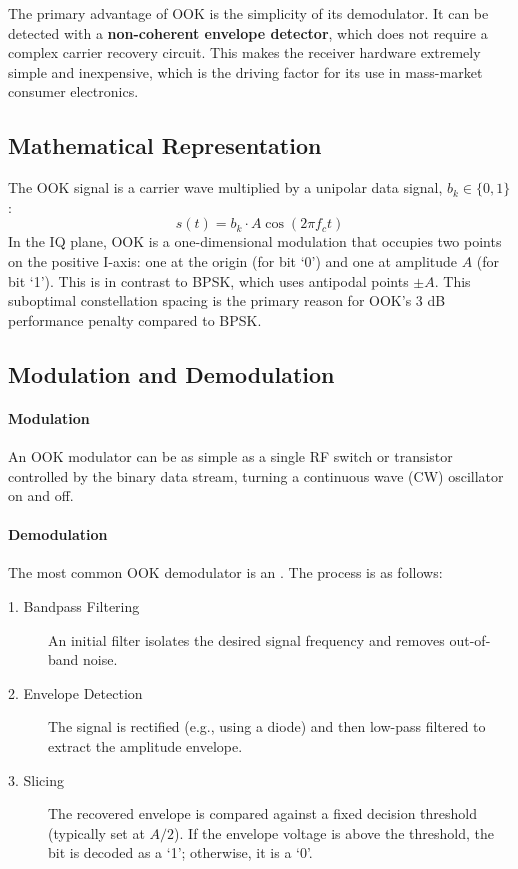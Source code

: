 \begin{keyconcept}
    The primary advantage of OOK is the simplicity of its demodulator. It can be detected with a \textbf{non-coherent envelope detector}, which does not require a complex carrier recovery circuit. This makes the receiver hardware extremely simple and inexpensive, which is the driving factor for its use in mass-market consumer electronics.
\end{keyconcept}


\subsection{Mathematical Representation}

The OOK signal is a carrier wave multiplied by a unipolar data signal, $b_k \in \{0, 1\}$:
\begin{equation}
    s(t) = b_k \cdot A \cos(2\pi f_c t)
\end{equation}
In the IQ plane, OOK is a one-dimensional modulation that occupies two points on the positive I-axis: one at the origin (for bit `0') and one at amplitude $A$ (for bit `1'). This is in contrast to BPSK, which uses antipodal points $\pm A$. This suboptimal constellation spacing is the primary reason for OOK's 3 dB performance penalty compared to BPSK.


\subsection{Modulation and Demodulation}

\paragraph{Modulation}
An OOK modulator can be as simple as a single RF switch or transistor controlled by the binary data stream, turning a continuous wave (CW) oscillator on and off.

\paragraph{Demodulation}
The most common OOK demodulator is an . The process is as follows:
\begin{description}
    \item[1. Bandpass Filtering] An initial filter isolates the desired signal frequency and removes out-of-band noise.
    \item[2. Envelope Detection] The signal is rectified (e.g., using a diode) and then low-pass filtered to extract the amplitude envelope.
    \item[3. Slicing] The recovered envelope is compared against a fixed decision threshold (typically set at $A/2$). If the envelope voltage is above the threshold, the bit is decoded as a `1'; otherwise, it is a `0'.
\end{description}


